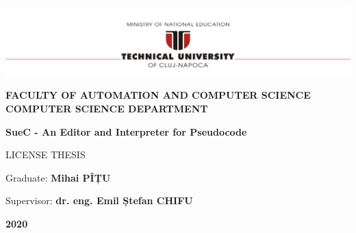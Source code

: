 \documentclass[12pt,a4paper,twoside]{report}
\renewcommand{\thesisauthor}{Mihai PÎȚU}    %
\renewcommand{\thesisyear}{2020}      %
\renewcommand{\thesistitle}{SueC - An Editor and Interpreter for Pseudocode}
\renewcommand{\thesissupervisor}{dr. eng. Emil Ștefan CHIFU}
\newcommand{\department}{\bf FACULTY OF AUTOMATION AND COMPUTER SCIENCE\\
COMPUTER SCIENCE DEPARTMENT}
\newcommand{\utcnlogo}{\includegraphics[width=15cm]{img/tucn.jpg}}
\begin{document}

\newenvironment{definition}[1][Defini\c{t}ie.]{\begin{trivlist}
\item[\hskip \labelsep {\bfseries #1}]}{\end{trivlist}}





\begin{center}
\utcnlogo

\department

\vspace{4cm}

{\bf \thesistitle} %

\vspace{1.5cm}

LICENSE THESIS

\vspace{6cm}

Graduate: {\bf \thesisauthor} 

Supervisor: {\bf \thesissupervisor}

\vspace{3cm}
{\bf \thesisyear}
\end{center}
\end{document}
